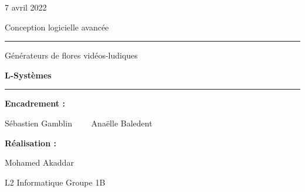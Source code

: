 \begin{titlepage}


\vspace{2cm}
\begin{flushright}
   \Large{ 7 avril 2022}
\end{flushright}

\vspace{4cm}
\begin{center}
    \Large{ Conception logicielle avancée}
\end{center}

\vspace{0.5cm}
\hrule
\begin{center}
    \Huge{ Générateurs de flores vidéos-ludiques}
    \begin{center}
      \huge{\textbf{L-Systèmes}}
    \end{center}
\end{center}
\hrule

\vspace{5cm}

\begin{center}
\Large{\textbf{Encadrement :}}
\vspace{0.2cm}

\Large{Sébastien Gamblin} \ \ \ \ \Large{Anaëlle Baledent}
\end{center}
\begin{center}
\Large{\textbf{Réalisation :}}

\vspace{0.2cm}
\Large{Mohamed Akaddar}
\end{center}
\begin{center}
\Large{L2 Informatique Groupe 1B}
\end{center}
   
\end{titlepage}